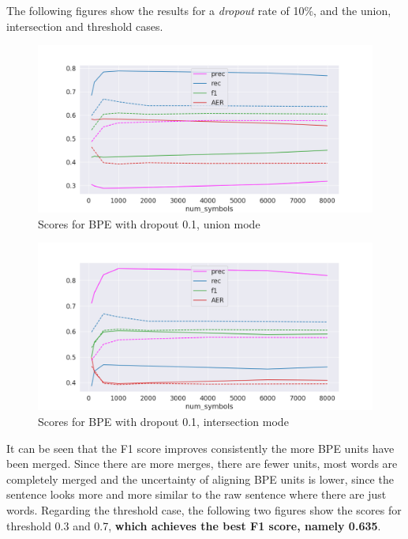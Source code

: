 The following figures show the results for a \emph{dropout} rate of 10\%, and the union, intersection and threshold cases.

 \begin{figure}[!ht]
     \centering
     \includegraphics[width=12cm]{../reports/scores_dropout_bpe/space/0.1/union_fastalign.png}
     \caption{Scores for BPE with dropout 0.1, union mode}
 \end{figure}
 
 \begin{figure}[!ht]
     \centering
     \includegraphics[width=11.5cm]{../reports/scores_dropout_bpe/space/0.1/inter_fastalign.png}
     \caption{Scores for BPE with dropout 0.1, intersection mode}
 \end{figure}

It can be seen that the F1 score improves consistently the more BPE units have been merged. Since there are more merges, there are fewer units, most words are completely merged and the uncertainty of aligning BPE units is lower, since the sentence looks more and more similar to the raw sentence where there are just words. Regarding the threshold case, the following two figures show the scores for threshold 0.3 and 0.7, \textbf{which achieves the best F1 score, namely 0.635}.

